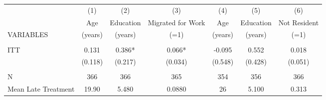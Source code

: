 \begin{tabular}{lcccccc} \hline
 & (1) & (2) & (3) & (4) & (5) & (6) \\
 & Age & Education & Migrated for Work & Age & Education & Not Resident \\
VARIABLES & (years) & (years) & (=1) & (years) & (years) & (=1) \\ \hline
 &  &  &  &  &  &  \\
ITT & 0.131 & 0.386* & 0.066* & -0.095 & 0.552 & 0.018 \\
 & (0.118) & (0.217) & (0.034) & (0.548) & (0.428) & (0.051) \\
 &  &  &  &  &  &  \\
N & 366 & 366 & 365 & 354 & 356 & 366 \\
 Mean Late Treatment & 19.90 & 5.480 & 0.0880 & 26 & 5.100 & 0.313 \\ \hline
\end{tabular}
